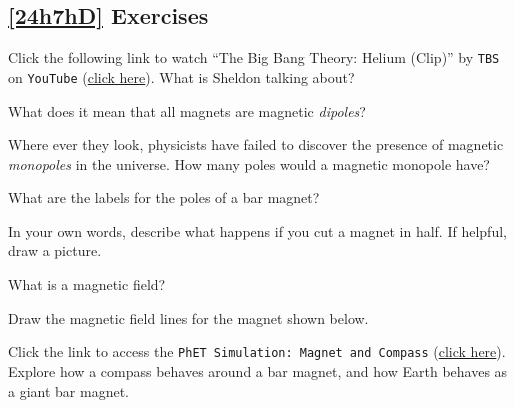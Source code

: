 \documentclass[main.tex]{subfiles}
\begin{document}
\vfill

\subsection*{\ref{24h7hD} Exercises}

\begin{exercise}
    Click the following link to watch ``The Big Bang Theory: Helium (Clip)'' by \texttt{TBS} on \texttt{YouTube} (\href{https://youtu.be/Q6Z0pCax9b8}{click here}). What is Sheldon talking about?
\end{exercise}

\begin{exercise}
    What does it mean that all magnets are magnetic \textit{dipoles}?
\end{exercise}

\begin{exercise}
    Where ever they look, physicists have failed to discover the presence of magnetic \textit{monopoles} in the universe. How many poles would a magnetic monopole have?
\end{exercise}

\begin{exercise}
    What are the labels for the poles of a bar magnet?
\end{exercise}


\begin{exercise}
    In your own words, describe what happens if you cut a magnet in half. If helpful, draw a picture.
\end{exercise}

\begin{exercise}
    What is a magnetic field?
\end{exercise}

\begin{exercise}
    Draw the magnetic field lines for the magnet shown below.

\begin{center}
\end{center}
\end{exercise}

\begin{exercise}
    Click the link to access the \texttt{PhET Simulation: Magnet and Compass} (\href{https://phet.colorado.edu/en/simulations/magnet-and-compass}{click here}). Explore how a compass behaves around a bar magnet, and how Earth behaves as a giant bar magnet.
\end{exercise}
\end{document}
